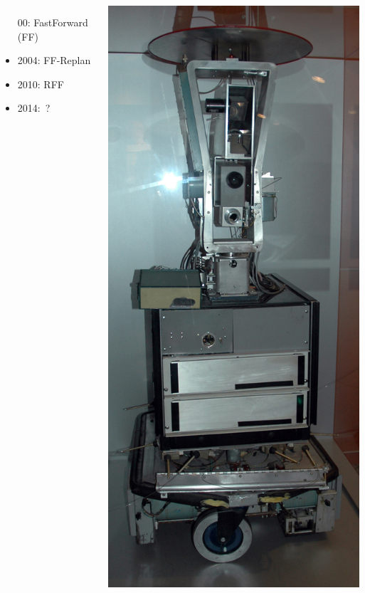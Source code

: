 \documentclass{beamer}
\begin{document}
\begin{frame}
\begin{columns}
\begin{itemize}
00: FastForward (FF)
      \item 2004: FF-Replan
      \item 2010: RFF
      \item 2014:~?
    \end{itemize}

    \includegraphics[width=\textwidth]{images/shakey.png}

  \end{columns}
\end{frame}
\end{document}
